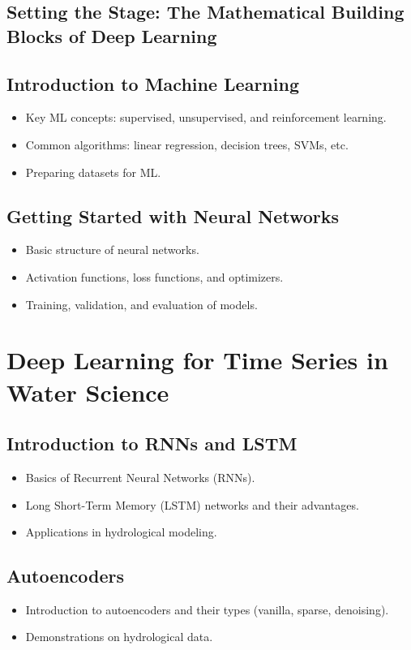 \chapter{Setting the Stage: The Mathematical Building Blocks of Deep Learning}


\chapter{Introduction to Machine Learning}
\begin{itemize}
    \item Key ML concepts: supervised, unsupervised, and reinforcement learning.
    \item Common algorithms: linear regression, decision trees, SVMs, etc.
    \item Preparing datasets for ML.
\end{itemize}

\chapter{Getting Started with Neural Networks}
\begin{itemize}
    \item Basic structure of neural networks.
    \item Activation functions, loss functions, and optimizers.
    \item Training, validation, and evaluation of models.
\end{itemize}

\part{Deep Learning for Time Series in Water Science}

\chapter{Introduction to RNNs and LSTM}
\begin{itemize}
    \item Basics of Recurrent Neural Networks (RNNs).
    \item Long Short-Term Memory (LSTM) networks and their advantages.
    \item Applications in hydrological modeling.
\end{itemize}

\chapter{Autoencoders}
\begin{itemize}
    \item Introduction to autoencoders and their types (vanilla, sparse, denoising).
    \item Demonstrations on hydrological data.
\end{itemize}

